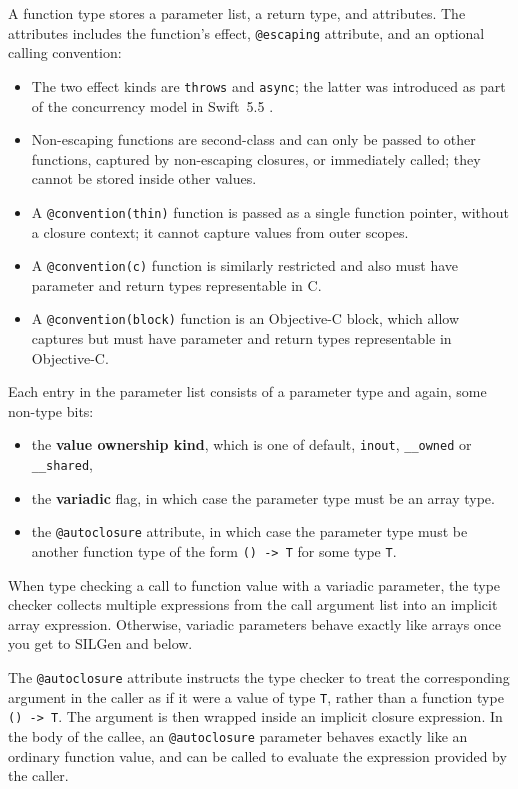 \documentclass[a4paper,headsepline,bibliography=totoc,toc=flat,fleqn,twoside=semi]{scrbook}
\theoremstyle{definition}
\theoremstyle{definition}
\theoremstyle{definition}
\begin{document}
A function type stores a parameter list, a return type, and attributes. The attributes includes the function's effect, \texttt{@escaping} attribute, and an optional calling convention:
\begin{itemize}
\item The two effect kinds are \texttt{throws} and \texttt{async}; the latter was introduced as part of the concurrency model in Swift~5.5 \cite{se0296}.
\item Non-escaping functions are second-class and can only be passed to other functions, captured by non-escaping closures, or immediately called; they cannot be stored inside other values.
\item A \texttt{@convention(thin)} function is passed as a single function pointer, without a closure context; it cannot capture values from outer scopes.
\item A \texttt{@convention(c)} function is similarly restricted and also must have parameter and return types representable in C.
\item A \texttt{@convention(block)} function is an Objective-C block, which allow captures but must have parameter and return types representable in Objective-C.
\end{itemize}

Each entry in the parameter list consists of a parameter type and again, some non-type bits:
\begin{itemize}
\item the \textbf{value ownership kind}, which is one of default, \texttt{inout}, \texttt{\_\_owned} or \texttt{\_\_shared},
\item the \textbf{variadic} flag, in which case the parameter type must be an array type.
\item the \texttt{@autoclosure} attribute, in which case the parameter type must be another function type of the form \texttt{() -> T} for some type \texttt{T}.
\end{itemize}
When type checking a call to function value with a variadic parameter, the type checker collects multiple expressions from the call argument list into an implicit array expression. Otherwise, variadic parameters behave exactly like arrays once you get to SILGen and below.

The \texttt{@autoclosure} attribute instructs the type checker to treat the corresponding argument in the caller as if it were a value of type \texttt{T}, rather than a function type \texttt{()~->~T}. The argument is then wrapped inside an implicit closure expression. In the body of the callee, an \texttt{@autoclosure} parameter behaves exactly like an ordinary function value, and can be called to evaluate the expression provided by the caller.
\end{document}
